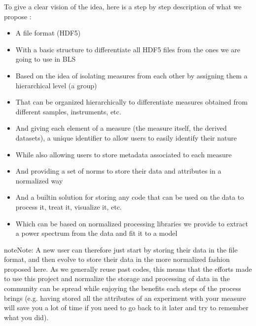 \documentclass[letterpaper,10pt,english]{sphinxmanual}
\begin{document}
\sphinxAtStartPar
To give a clear vision of the idea, here is a step by step description of what we propose :
\begin{itemize}
\item {} 
\sphinxAtStartPar
A file format (HDF5)

\item {} 
\sphinxAtStartPar
With a basic structure to differentiate all HDF5 files from the ones we are going to use in BLS

\item {} 
\sphinxAtStartPar
Based on the idea of isolating measures from each other by assigning them a hierarchical level (a group)

\item {} 
\sphinxAtStartPar
That can be organized hierarchically to differentiate measures obtained from different samples, instruments, etc.

\item {} 
\sphinxAtStartPar
And giving each element of a measure (the measure itself, the derived datasets), a unique identifier to allow users to easily identify their nature

\item {} 
\sphinxAtStartPar
While also allowing users to store metadata associated to each measure

\item {} 
\sphinxAtStartPar
And providing a set of norms to store their data and attributes in a normalized way

\item {} 
\sphinxAtStartPar
And a built\sphinxhyphen{}in solution for storing any code that can be used on the data to process it, treat it, visualize it, etc.

\item {} 
\sphinxAtStartPar
Which can be based on normalized processing libraries we provide to extract a power spectrum from the data and fit it to a model

\end{itemize}

\begin{sphinxadmonition}{note}{Note:}
\sphinxAtStartPar
A new user can therefore just start by storing their data in the file format, and then evolve to store their data in the more normalized fashion proposed here. As we generally re\sphinxhyphen{}use past codes, this means that the efforts made to use this project and normalize the storage and processing of data in the community can be spread while enjoying the benefits each steps of the process brings (e.g. having stored all the attributes of an experiment with your measure will save you a lot of time if you need to go back to it later and try to remember what you did).
\end{sphinxadmonition}
\end{document}
